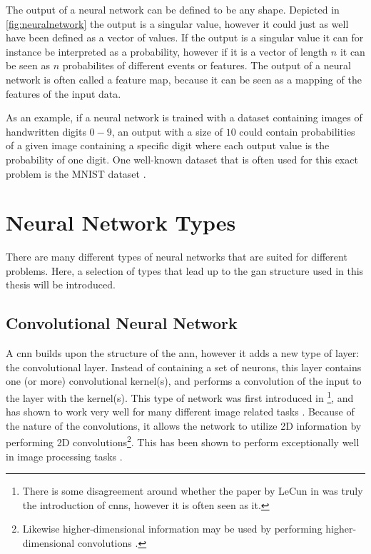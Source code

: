 The output of a neural network can be defined to be any shape. Depicted in \cref{fig:neuralnetwork} the output is a singular value, however it could just as well have been defined as a vector of values. If the output is a singular value it can for instance be interpreted as a probability, however if it is a vector of length $n$ it can be seen as $n$ probabilites of different events or features. The output of a neural network is often called a feature map, because it can be seen as a mapping of the features of the input data. 

As an example, if a neural network is trained with a dataset containing images of handwritten digits $0-9$, an output with a size of $10$ could contain probabilities of a given image containing a specific digit where each output value is the probability of one digit. One well-known dataset that is often used for this exact problem is the MNIST dataset \cite{mnist}.


\section{Neural Network Types}
There are many different types of neural networks that are suited for different problems. Here, a selection of types that lead up to the \acrfull{gan} structure used in this thesis will be introduced. 

\subsection{Convolutional Neural Network}
A \acrfull{cnn} builds upon the structure of the \acrshort{ann}, however it adds a new type of layer: the convolutional layer. Instead of containing a set of neurons, this layer contains one (or more) convolutional kernel(s), and performs a convolution of the input to the layer with the kernel(s). This type of network was first introduced in \citeyear{lecun1999object}\footnote{There is some disagreement around whether the paper by LeCun in \citeyear{lecun1999object} \cite{lecun1999object} was truly the introduction of \acrshort{cnn}s, however it is often seen as it. }, and has shown to work very well for many different image related tasks \cite{lecun1999object,alexnet}. Because of the nature of the convolutions, it allows the network to utilize 2D information by performing 2D convolutions\footnote{Likewise higher-dimensional information may be used by performing higher-dimensional convolutions \cite{8353466}. }. This has been shown to perform exceptionally well in image processing tasks \cite{alexnet,oshea2015introduction}. 

